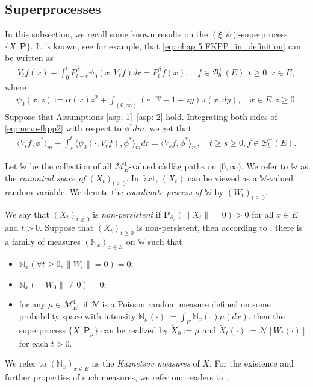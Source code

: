 \documentclass[UTF8]{pkuthss}
\theoremstyle{plain}
\theoremstyle{definition}
\numberwithin{equation}{section}
\begin{document}
\subsection{Superprocesses} \label{sec: Superprocesses}
	In this subsection, we recall some known results on the $(\xi, \psi)$-superprocess $\{X; \mathbf P\}$.
	It is known, see \cite[Theorem 2.23]{Li2011Measure-valued} for example, that \eqref{eq: chap 5 FKPP_in_definition} can be written as
\begin{align}\label{eq:mean-fkpp2}
	V_t f(x) + \int_0^t P^\beta_{t-r} \psi_0(x,V_r f) dr
	= P^\beta_t f(x),
	\quad f \in \mathscr B^+_b(E), t \geq 0,x \in E,
\end{align}
	where
\begin{align}
	\psi_0(x,z)
	:= \alpha(x) z^2 + \int_{(0,\infty)} (e^{-z y} - 1 + z y) \pi(x,dy),
	\quad x \in E,z \geq 0.
\end{align}
    Suppose that Assumptions \ref{asp: 1}--\ref{asp: 2} hold.
    Integrating both sides of \eqref{eq:mean-fkpp2}  with respect to  $\phi^*dm$, we get that
\begin{align}\label{eq:langleVtfphiranglem_equation}
	\langle V_tf,\phi^*\rangle_m + \int_s^t \langle \psi_0(\cdot ,V_r f) , \phi^*\rangle_mdr
	= \langle V_sf,\phi^*\rangle_m,
	\quad t\geq s\geq 0, f\in \mathscr B^+_b(E).
\end{align}

	Let $\mathbb W$ be the collection of all $\mathcal M^1_E$-valued c\`{a}dl\`{a}g paths on $[0,\infty)$.
	We refer to $\mathbb W$ as the \emph{canonical space of $(X_t)_{t\geq 0}$}.
	In fact, $(X_t)$ can be viewed as a $\mathbb W$-valued random variable.
	We denote the \emph{coordinate process of $\mathbb W$} by $(W_t)_{t\geq 0}$.

	We say that $(X_t)_{t\geq 0}$ is \emph{non-persistent} if $\mathbf P_{\delta_x}(\|X_t\|= 0) > 0$ for all $x\in E$ and $t> 0$.
	Suppose that $(X_t)_{t\geq 0}$ is non-persistent,
	then according to \cite[Section 8.4]{Li2011Measure-valued},
	there is a family of measures $(\mathbb N_x)_{x\in E}$ on $\mathbb W$ such that
\begin{itemize}
\item
	$\mathbb N_x (\forall t \geq 0, \|W_t\|=0) =0$;
\item
	$\mathbb N_x(\|W_0 \|\neq 0) = 0$;
\item
	for any $\mu \in \mathcal M_E^1$, if $\mathcal N$ is a Poisson random measure defined on some probability space
	with intensity $\mathbb N_\mu(\cdot):= \int_E \mathbb N_x(\cdot )\mu(dx)$,
	then the superprocess $\{X;\mathbf P_\mu\}$ can be realized by $\widetilde X_0 := \mu$ and $\widetilde X_t(\cdot) := \mathcal N[W_t(\cdot)]$ for each $t>0$.
\end{itemize}
	We refer to $(\mathbb N_x)_{x\in E}$ as the \emph{Kuznetsov measures} of $X$.
	For the existence and further properties of such measures, we refer our readers to \cite{Li2011Measure-valued}.
\end{document}
